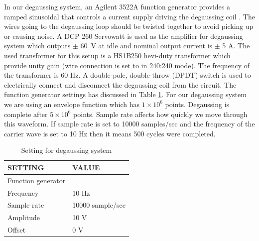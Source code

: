 In our degaussing system, an Agilent 3522A function generator  provides a ramped sinusoidal that controls a current supply driving the degaussing coil \cite{Martin:2014foa}. The wires going to the degaussing loop should be twisted together to avoid picking up or causing noise.  A DCP 260 Servowatt is used as the amplifier for degaussing system which outputs $\pm$ 60~V at idle and nominal output current is  $\pm$ 5 A. The used transformer for this setup is a  HS1B250 hevi-duty transformer which provide unity gain (wire connection is set to in 240:240 mode). The frequency of the transformer is  60 Hz.  A double-pole, double-throw (DPDT) switch is used to electrically connect and disconnect the degaussing coil from the circuit. The function generator settings has discussed in Table \ref{table:degaussing setting}. For our degaussing system we are using an envelope function which has $1\times 10^6$ points. Degaussing is complete after $5\times 10^6$ points. Sample rate affects how quickly we move through this waveform. If sample rate is set to 10000 samples/sec and the frequency of the carrier wave is set to 10 Hz then it means 500 cycles were completed. 
 \begin{table}%
\centering
\begin{tabular}{|l|l|}
\hline
\textbf{ SETTING}    & \textbf{ VALUE} \\
\hline
Function generator &   \\
\hline
Frequency &  10 Hz   \\
Sample rate    &  10000 sample/sec  \\
Amplitude   &   10 V \\
Offset  &       0 V  \\
\hline
\end{tabular}
\caption{Setting for degaussing system \label{table:degaussing setting}}
\end{table}


